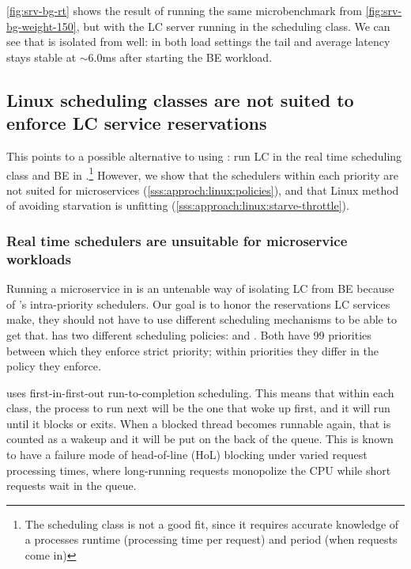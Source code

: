 \autoref{fig:srv-bg-rt} shows the result of running the same microbenchmark from
\autoref{fig:srv-bg-weight-150}, but with the LC server running in the
\rtclass{} scheduling class. We can see that \rtclass{} is isolated from
\normalclass{} well: in both load settings the tail and average latency stays
stable at $\sim$6.0ms after starting the BE workload.

\subsection{Linux scheduling classes are not suited to enforce LC service
reservations}\label{ss:approach:linux-classes-bad-fit}

This points to a possible alternative to using \cgroups{}: run LC in the real
time \rtclass{} scheduling class and BE in \normalclass{}.\footnote{The
\deadlineclass{} scheduling class is not a good fit, since it requires accurate
knowledge of a processes runtime (processing time per request) and period (when
requests come in)} However, we show that the schedulers within each priority are
not suited for microservices (\autoref{sss:approch:linux:policies}), and that
Linux method of avoiding starvation is unfitting
(\autoref{sss:approach:linux:starve-throttle}).

\subsubsection{Real time schedulers are unsuitable for microservice
workloads}\label{sss:approch:linux:policies}

Running a microservice in \rtclass{} is an untenable way of isolating LC from BE
because of \rtclass{}'s intra-priority schedulers. Our goal is to honor the
reservations LC services make, they should not have to use different scheduling
mechanisms to be able to get that.  \rtclass{} has two
different scheduling policies: \schedfifo{} and \schedrr{}. Both have 99
priorities between which they enforce strict priority; within priorities they
differ in the policy they enforce.

\schedfifo{} uses first-in-first-out run-to-completion scheduling. This means
that within each class, the process to run next will be the one that woke up
first, and it will run until it blocks or exits. When a blocked thread becomes
runnable again, that is counted as a wakeup and it will be put on the back of
the queue. This is known to have a failure mode of head-of-line (HoL) blocking
under varied request processing times, where long-running requests monopolize
the CPU while short requests wait in the queue.

